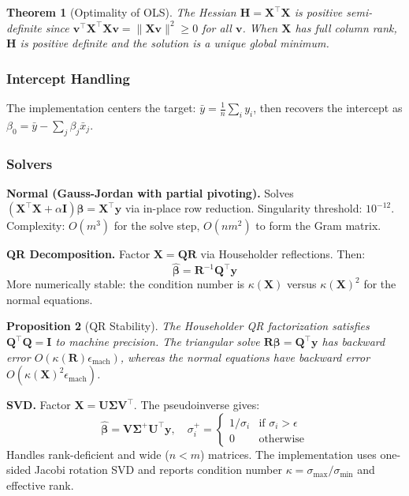 \documentclass[11pt,a4paper]{article}
\newtheorem{theorem}{Theorem}[section]
\newtheorem{proposition}[theorem]{Proposition}
\theoremstyle{definition}
\theoremstyle{remark}
\begin{document}
\begin{theorem}[Optimality of OLS]
The Hessian $\mathbf{H} = \mathbf{X}^\top\mathbf{X}$ is positive semi-definite since $\mathbf{v}^\top\mathbf{X}^\top\mathbf{X}\mathbf{v} = \|\mathbf{X}\mathbf{v}\|^2 \geq 0$ for all $\mathbf{v}$. When $\mathbf{X}$ has full column rank, $\mathbf{H}$ is positive definite and the solution is a unique global minimum.
\end{theorem}

\subsubsection*{Intercept Handling}

The implementation centers the target: $\bar{y} = \frac{1}{n}\sum_i y_i$, then recovers the intercept as $\beta_0 = \bar{y} - \sum_j \beta_j \bar{x}_j$.

\subsubsection*{Solvers}

\textbf{Normal (Gauss-Jordan with partial pivoting).} Solves $(\mathbf{X}^\top\mathbf{X} + \alpha\mathbf{I})\boldsymbol{\beta} = \mathbf{X}^\top\mathbf{y}$ via in-place row reduction. Singularity threshold: $10^{-12}$. Complexity: $O(m^3)$ for the solve step, $O(nm^2)$ to form the Gram matrix.

\textbf{QR Decomposition.} Factor $\mathbf{X} = \mathbf{Q}\mathbf{R}$ via Householder reflections. Then:
\begin{equation}
\hat{\boldsymbol{\beta}} = \mathbf{R}^{-1}\mathbf{Q}^\top\mathbf{y}
\end{equation}
More numerically stable: the condition number is $\kappa(\mathbf{X})$ versus $\kappa(\mathbf{X})^2$ for the normal equations.

\begin{proposition}[QR Stability]
The Householder QR factorization satisfies $\mathbf{Q}^\top\mathbf{Q} = \mathbf{I}$ to machine precision. The triangular solve $\mathbf{R}\boldsymbol{\beta} = \mathbf{Q}^\top\mathbf{y}$ has backward error $O(\kappa(\mathbf{R})\epsilon_{\mathrm{mach}})$, whereas the normal equations have backward error $O(\kappa(\mathbf{X})^2\epsilon_{\mathrm{mach}})$.
\end{proposition}

\textbf{SVD.} Factor $\mathbf{X} = \mathbf{U}\boldsymbol{\Sigma}\mathbf{V}^\top$. The pseudoinverse gives:
\begin{equation}
\hat{\boldsymbol{\beta}} = \mathbf{V}\boldsymbol{\Sigma}^+\mathbf{U}^\top\mathbf{y}, \quad \sigma_i^+ = \begin{cases} 1/\sigma_i & \text{if } \sigma_i > \epsilon \\ 0 & \text{otherwise} \end{cases}
\end{equation}
Handles rank-deficient and wide ($n < m$) matrices. The implementation uses one-sided Jacobi rotation SVD and reports condition number $\kappa = \sigma_{\max}/\sigma_{\min}$ and effective rank.
\end{document}
